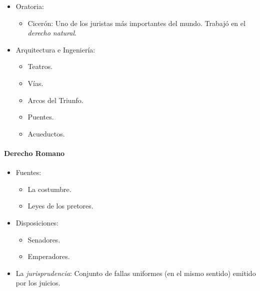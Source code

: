 \begin{itemize}
\item Oratoria:
\begin{itemize}
	\item Cicerón: Uno de los juristas más importantes del mundo. Trabajó en el \emph{derecho natural}.
\end{itemize}

\item Arquitectura e Ingeniería:
\begin{itemize}
	\item Teatros.
	\item Vías.
	\item Arcos del Triunfo.
	\item Puentes.
	\item Acueductos.
\end{itemize}

\end{itemize}

\paragraph{Derecho Romano}

\begin{itemize}

\item Fuentes:
\begin{itemize}
	\item La costumbre.
	\item Leyes de los pretores.
\end{itemize}

\item Disposiciones:
\begin{itemize}
	\item Senadores.
	\item Emperadores.
\end{itemize}

\item La \emph{jurisprudencia}: Conjunto de fallas uniformes (en el mismo sentido) emitido por los juicios.

\end{itemize}